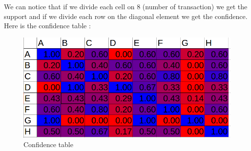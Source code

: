\documentclass{article}
\begin{document}
We can notice that if we divide each cell on 8 (number of transaction) we get the support and if we divide each row on the diagonal element we get the confidence.\\
Here is the confidence table :
\begin{figure}[H]
	\includegraphics[scale=0.6]{5q2.png}
\caption{Confidence table}
\end{figure}
\end{document}
